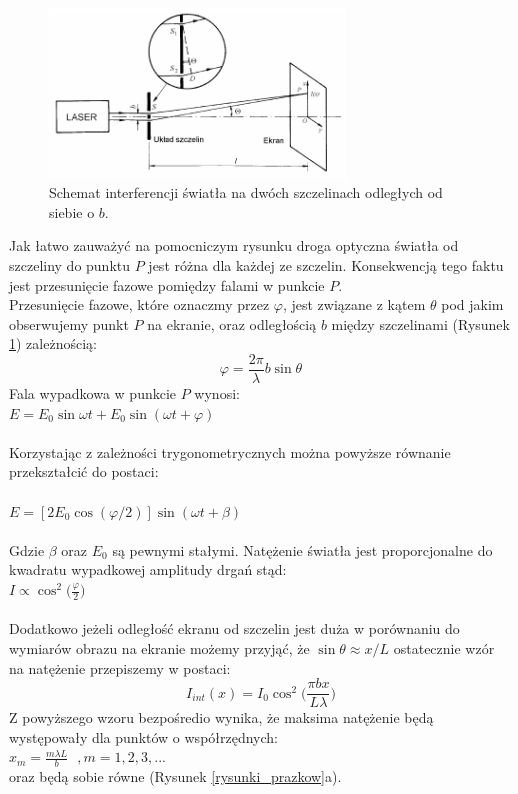 \documentclass{article}
\begin{document}
\begin{figure}[h!]
	\centering
	\includegraphics[width=0.7\textwidth]{images/interferencja.png}
	\caption{Schemat interferencji światła na dwóch szczelinach odległych od siebie o $b$.\cite{1}}
	\label{schemat_interferencja}
\end{figure}
Jak łatwo zauważyć na pomocniczym rysunku droga optyczna światła od szczeliny do punktu $P$ jest różna dla każdej ze szczelin. Konsekwencją tego faktu jest przesunięcie fazowe pomiędzy falami w punkcie $P$. \\
Przesunięcie fazowe, które oznaczmy przez $\varphi$, jest związane z kątem $\theta$ pod jakim obserwujemy punkt $P$ na ekranie, oraz odległością $b$ między szczelinami (Rysunek \ref{schemat_interferencja}) zależnością\cite{1}:
\begin{equation}
\varphi = \frac{2\pi}{\lambda}b \sin \theta
\label{wz_fi}
\end{equation}
Fala wypadkowa w punkcie $P$ wynosi:\\
$E=E_0\sin \omega t +E_0\sin (\omega t + \varphi)$\\\\
Korzystając z zależności trygonometrycznych można powyższe równanie przekształcić do postaci\cite{1}:\\\\
$E=[2E_0\cos (\varphi/2)]\sin(\omega t + \beta)$\\\\
Gdzie $\beta$ oraz $E_0$ są pewnymi stałymi. Natężenie światła jest proporcjonalne do kwadratu wypadkowej amplitudy drgań stąd:\\
$I\propto \cos ^2 \Big(\frac{\varphi}{2}\Big)$\\\\
Dodatkowo jeżeli odległość ekranu od szczelin jest duża w porównaniu do wymiarów obrazu na ekranie możemy przyjąć, że $\sin\theta \approx x/L$ ostatecznie wzór na natężenie przepiszemy w postaci:\\
\begin{equation}
I_{int}(x) = I_0\cos ^2 \Big(\frac{\pi bx}{L\lambda}\Big)
\label{wz_natezenie_interferencja}
\end{equation}
Z powyższego wzoru bezpośredio wynika, że maksima natężenie będą występowały dla punktów o współrzędnych:\\
$x_m = \frac{m\lambda L}{b}\ \ \ ,m=1,2,3,...$\\
oraz będą sobie równe (Rysunek \ref{rysunki_prazkow}a).\\
\end{document}
